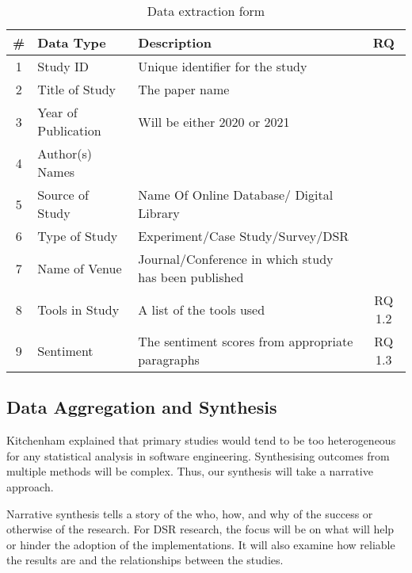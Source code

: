 \begin{table}[h]
	\centering
	\begin{tabular}{|c | l | l | c |} 
		\hline
		\#& Data Type           & Description                                          & RQ     \\ \hline
		\hline
        1 & Study ID            & Unique identifier for the study                      &        \\ \hline
        2 & Title of Study      & The paper name                                       &        \\ \hline
        3 & Year of Publication & Will be either 2020 or 2021                          &        \\ \hline
        4 & Author(s) Names     &                                                      &        \\ \hline
        5 & Source of Study     & Name Of Online Database/ Digital Library             &        \\ \hline
        6 & Type of Study       & Experiment/Case Study/Survey/DSR                     &        \\ \hline
        7 & Name of Venue       & Journal/Conference in which study has been published &        \\ \hline
        8 & Tools in Study      & A list of the tools used                             & RQ 1.2 \\ \hline
        9 & Sentiment           & The sentiment scores from appropriate paragraphs     & RQ 1.3 \\ \hline		
	\end{tabular}	
	\caption{Data extraction form}
    \label{table:Data_Extraction_Form}
\end{table}

\subsection{Data Aggregation and Synthesis}
Kitchenham\cite{kitchenham2015evidence} explained that primary studies would tend to be too heterogeneous for any statistical analysis in software engineering. 
Synthesising outcomes from multiple methods will be complex.
Thus, our synthesis will take a narrative approach.

Narrative synthesis tells a story of the who, how, and why of the success or otherwise of the research.
For DSR research, the focus will be on what will help or hinder the adoption of the implementations.
It will also examine how reliable the results are and the relationships between the studies.

